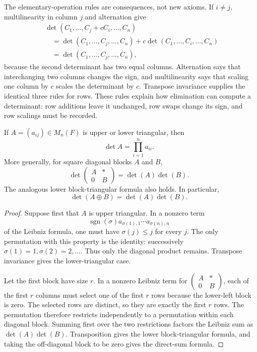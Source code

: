 The elementary-operation rules are consequences, not new axioms.  If
\(i\ne j\), multilinearity in column \(j\) and alternation give
\[
\begin{aligned}
&\det(C_1,\ldots,C_j+cC_i,\ldots,C_n)\\
&\quad=\det(C_1,\ldots,C_j,\ldots,C_n)
+c\det(C_1,\ldots,C_i,\ldots,C_n)\\
&\quad=\det(C_1,\ldots,C_j,\ldots,C_n),
\end{aligned}
\]
because the second determinant has two equal columns.  Alternation says that
interchanging two columns changes the sign, and multilinearity says that
scaling one column by \(c\) scales the determinant by \(c\).  Transpose
invariance supplies the identical three rules for rows.  These rules explain
how elimination can compute a determinant: row additions leave it unchanged,
row swaps change its sign, and row scalings must be recorded.

\begin{theorem}
\label{thm:block-triangular-determinant}
If \(A=(a_{ij})\in M_n(F)\) is upper or lower triangular, then
\[
\det A=\prod_{i=1}^n a_{ii}.
\]
More generally, for square diagonal blocks \(A\) and \(B\),
\[
\det\begin{pmatrix}A&*\\0&B\end{pmatrix}
=\det(A)\det(B).
\]
The analogous lower block-triangular formula also holds.  In particular,
\[
\det(A\oplus B)=\det(A)\det(B).
\]
\end{theorem}
\begin{proof}
Suppose first that \(A\) is upper triangular.  In a nonzero term
\[
\operatorname{sgn}(\sigma)
a_{\sigma(1),1}\cdots a_{\sigma(n),n}
\]
of the Leibniz formula, one must have \(\sigma(j)\leq j\) for every \(j\).
The only permutation with this property is the identity: successively
\(\sigma(1)=1,\sigma(2)=2,\ldots\).  Thus only the diagonal product remains.
Transpose invariance gives the lower-triangular case.

Let the first block have size \(r\).  In a nonzero Leibniz term for
\(\begin{pmatrix}A&*\\0&B\end{pmatrix}\), each of the first \(r\) columns
must select one of the first \(r\) rows because the lower-left block is zero.
The selected rows are distinct, so they are exactly the first \(r\) rows.
The permutation therefore restricts independently to a permutation within
each diagonal block.  Summing first over the two restrictions factors the
Leibniz sum as \(\det(A)\det(B)\).  Transposition gives the lower
block-triangular formula, and taking the off-diagonal block to be zero gives
the direct-sum formula.
\end{proof}

